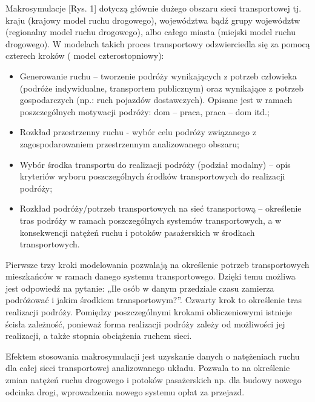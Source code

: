 \documentclass{sprawozdanie-agh}
\begin{document}
		Makrosymulacje [Rys. 1] dotyczą głównie dużego obszaru sieci transportowej tj. kraju (krajowy model ruchu drogowego), województwa bądź grupy województw (regionalny model ruchu drogowego), albo całego miasta (miejski model ruchu drogowego). W modelach takich proces transportowy odzwierciedla się za pomocą czterech kroków ( model czterostopniowy):

		\begin{itemize}
			\item  Generowanie ruchu – tworzenie podróży wynikających z potrzeb człowieka (podróże indywidualne, transportem publicznym) oraz wynikające z potrzeb gospodarczych (np.: ruch pojazdów dostawczych). Opisane jest w ramach poszczególnych motywacji podróży: dom – praca, praca – dom itd.;
			\item Rozkład przestrzenny ruchu - wybór celu podróży związanego z zagospodarowaniem przestrzennym analizowanego obszaru;
			\item Wybór środka transportu do realizacji podróży (podział modalny) – opis kryteriów wyboru poszczególnych środków transportowych do realizacji podróży;
			\item Rozkład podróży/potrzeb transportowych na sieć transportową – określenie tras podróży w ramach poszczególnych systemów transportowych, a w konsekwencji natężeń ruchu i potoków pasażerskich w środkach transportowych.
		\end{itemize}

		Pierwsze trzy kroki modelowania pozwalają na określenie potrzeb transportowych mieszkańców w ramach danego systemu transportowego. Dzięki temu możliwa jest odpowiedź na pytanie: „Ile osób w danym przedziale czasu zamierza podróżować i jakim środkiem transportowym?”. Czwarty krok to określenie tras realizacji podróży. Pomiędzy poszczególnymi krokami obliczeniowymi istnieje ścisła zależność, ponieważ forma realizacji podróży zależy od możliwości jej realizacji, a także stopnia obciążenia ruchem sieci.

		Efektem stosowania makrosymulacji jest uzyskanie danych o natężeniach ruchu dla całej sieci transportowej analizowanego układu. Pozwala to na określenie zmian natężeń ruchu drogowego i potoków pasażerskich np. dla budowy nowego odcinka drogi, wprowadzenia nowego systemu opłat za przejazd.
\end{document}
